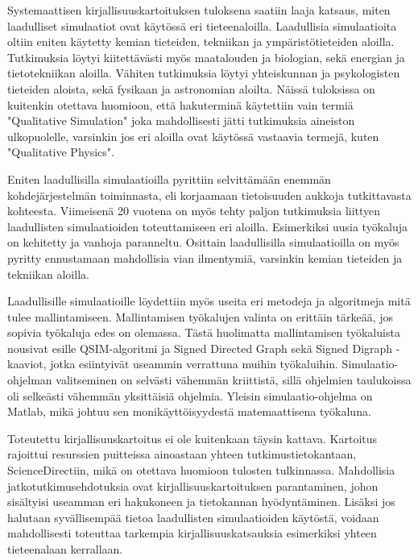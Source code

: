 \documentclass[utf8]{gradu3}
\begin{document}
Systemaattisen kirjallisuuskartoituksen tuloksena saatiin laaja katsaus, miten 
laadulliset simulaatiot ovat käytössä eri tieteenaloilla. 
Laadullisia simulaatioita oltiin eniten käytetty kemian tieteiden, 
tekniikan ja ympäristötieteiden aloilla. Tutkimuksia löytyi kiitettävästi myös
maatalouden ja biologian, sekä energian ja tietotekniikan aloilla. 
Vähiten tutkimuksia löytyi yhteiskunnan ja psykologisten tieteiden aloista, sekä 
fysikaan ja astronomian aloilta. Näissä tuloksissa on kuitenkin otettava huomioon,
että hakuterminä käytettiin vain termiä "Qualitative Simulation" joka mahdollisesti
jätti tutkimuksia aineiston ulkopuolelle, 
varsinkin jos eri aloilla ovat käytössä vastaavia termejä, kuten "Qualitative Physics".

Eniten laadullisilla simulaatioilla pyrittiin
selvittämään enemmän kohdejärjestelmän toiminnasta, eli korjaamaan tietoisuuden aukkoja
tutkittavasta kohteesta. Viimeisenä 20 vuotena on myös tehty paljon tutkimuksia liittyen 
laadullisten simulaatioiden toteuttamiseen eri aloilla. 
Esimerkiksi uusia työkaluja on kehitetty ja vanhoja paranneltu.
Osittain laadullisilla simulaatioilla on myös pyritty ennustamaan mahdollisia vian 
ilmentymiä, varsinkin kemian tieteiden ja tekniikan aloilla.

Laadullisille simulaatioille löydettiin myös useita eri metodeja ja algoritmeja 
mitä tulee mallintamiseen. Mallintamisen työkalujen valinta on erittäin tärkeää,
jos sopivia työkaluja edes on olemassa. Tästä huolimatta mallintamisen työkaluista
nousivat esille QSIM-algoritmi ja Signed Directed Graph sekä Signed Digraph -kaaviot, 
jotka esiintyivät useammin verrattuna muihin työkaluihin.
Simulaatio-ohjelman valitseminen on selvästi vähemmän kriittistä, sillä ohjelmien taulukoissa
oli selkeästi vähemmän yksittäisiä ohjelmia. 
Yleisin simulaatio-ohjelma on Matlab, mikä johtuu sen monikäyttöisyydestä 
matemaattisena työkaluna.

Toteutettu kirjallisuuskartoitus ei ole kuitenkaan täysin kattava. 
Kartoitus rajoittui resurssien puitteissa ainoastaan yhteen tutkimustietokantaan,
ScienceDirectiin, mikä on otettava huomioon tulosten tulkinnassa. 
Mahdollisia jatkotutkimusehdotuksia ovat kirjallisuuskartoituksen parantaminen, 
johon sisältyisi useamman eri hakukoneen ja tietokannan hyödyntäminen.
Lisäksi jos halutaan syvällisempää tietoa laadullisten simulaatioiden käytöstä, 
voidaan mahdollisesti toteuttaa tarkempia kirjallisuuskatsauksia esimerkiksi yhteen 
tieteenalaan kerrallaan.

\printbibliography
\end{document}
